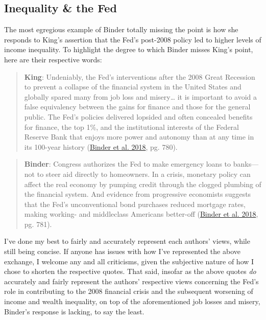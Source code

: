 \documentclass[
  12pt,
]{article}
\begin{document}
\hypertarget{inequality-the-fed}{%
\subsection{Inequality \& the Fed}\label{inequality-the-fed}}

The most egregious example of Binder totally missing the point is how
she responds to King's assertion that the Fed's post-2008 policy led to
higher levels of income inequality. To highlight the degree to which
Binder misses King's point, here are their respective words:

\begin{quote}
\textbf{King}: Undeniably, the Fed's interventions after the 2008 Great
Recession to prevent a collapse of the ﬁnancial system in the United
States and globally spared many from job loss and misery\ldots{} it is
important to avoid a false equivalency between the gains for ﬁnance and
those for the general public. The Fed's policies delivered lopsided and
often concealed beneﬁts for ﬁnance, the top 1\%, and the institutional
interests of the Federal Reserve Bank that enjoys more power and
autonomy than at any time in its 100-year history
(\protect\hyperlink{ref-binder2018c}{Binder et al. 2018}, pg. 780).
\end{quote}

\begin{quote}
\textbf{Binder}: Congress authorizes the Fed to make emergency loans to
banks---not to steer aid directly to homeowners. In a crisis, monetary
policy can affect the real economy by pumping credit through the clogged
plumbing of the ﬁnancial system. And evidence from progressive
economists suggests that the Fed's unconventional bond purchases reduced
mortgage rates, making working- and middleclass Americans better-off
(\protect\hyperlink{ref-binder2018c}{Binder et al. 2018}, pg. 781).
\end{quote}

I've done my best to fairly and accurately represent each authors'
views, while still being concise. If anyone has issues with how I've
represented the above exchange, I welcome any and all criticisms, given
the subjective nature of how I chose to shorten the respective quotes.
That said, insofar as the above quotes \emph{do} accurately and fairly
represent the authors' respective views concerning the Fed's role in
contributing to the 2008 financial crisis and the subsequent worsening
of income and wealth inequality, on top of the aforementioned job losses
and misery, Binder's response is lacking, to say the least.
\end{document}
